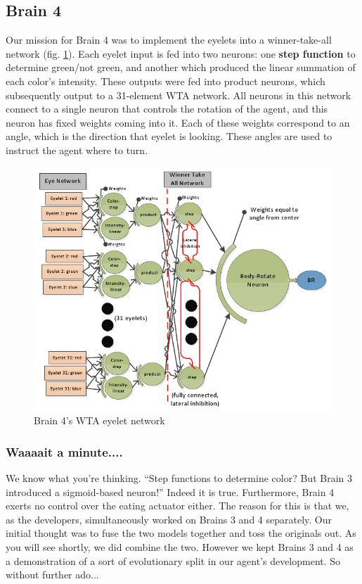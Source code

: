 \subsection{Brain 4}

Our mission for Brain 4 was to implement the eyelets into a
winner-take-all network (fig. \ref{fig:brain4}). Each eyelet input is fed 
into two neurons: one \textbf{step function} to determine green/not green, and 
another 
which produced the linear summation of each color's intensity. These outputs
were fed into product neurons, which subsequently output to a 31-element WTA 
network. All 
neurons in this network connect to a single neuron that controls the rotation 
of the agent, and this neuron has fixed weights coming into it. Each of these 
weights correspond to an angle, which is the direction that eyelet is looking. 
These angles are used to instruct the agent where to turn.

\begin{figure}
\begin{center}
  \includegraphics[scale=.52]{img/brain4.png}
  \caption{Brain 4's WTA eyelet network}
  \label{fig:brain4}
\end{center}
\end{figure}

\subsubsection{Waaaait a minute....}
We know what you're thinking. ``Step functions to determine color? But Brain 
3 introduced a sigmoid-based neuron!'' Indeed it is true. Furthermore, Brain
4 exerts no control over the eating actuator either. The reason for this is
that we, as the developers, simultaneously worked on Brains 3 and 4 separately.
Our initial thought was to fuse the two models together and toss the originals 
out. As you will see shortly, we did combine the two. However we kept Brains 
3 and 4 as a demonstration of a sort of evolutionary split in our agent's 
development. So without further ado...

